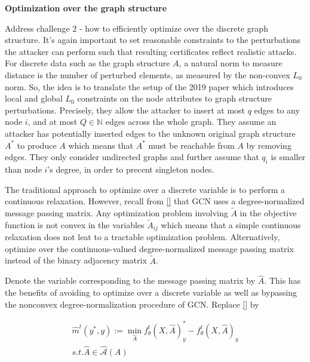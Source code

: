 \documentclass[a4paper,preprint]{sig-alternate}
\begin{document}
\vfill
\pagebreak

\textbf{Optimization over the graph structure}\newline

Address challenge $2$ - how to efficiently optimize over the discrete graph structure.
It's again important to set reasonable constraints to the perturbations the attacker can perform
such that resulting certificates reflect realistic attacks.\newline
For discrete data such as the graph structure $A$, a natural norm to measure distance is the number of perturbed
elements, as measured by the non-convex $L_0$ norm. So, the idea is to translate the setup of the 2019 paper
which introduces local and global $L_0$ constraints on the node attributes to graph structure perturbations.\newline
Precisely, they allow the attacker to insert at most $q$ edges to any node $i$, and at most $Q \in \mathbb{N}$ edges
across the whole graph.\newline
They assume an attacker has potentially inserted edges to the unknown original graph structure $A^{\ast}$ to produce
$A$ which means that $A^{\ast}$ must be reachable from $A$ by removing edges. They only consider undirected graphs
and further assume that $q_i$ is smaller than node $i$'s degree, in order to precent singleton nodes.\newline

The traditional approach to optimize over a discrete variable is to perform a continuous relaxation. However,
recall from \ref{} that GCN uses a degree-normalized message passing matrix. Any optimization problem involving
$\tilde{A}$ in the objective function is not convex in the variables $\tilde{A}_{ij}$ which means that a simple continuous
relaxation does not leat to a tractable optimization problem.\newline
Alternatively, optimize over the continuous-valued degree-normalized message passing matrix instead of the binary
adjacency matrix $\tilde{A}$.\newline

Denote the variable corresponding to the message passing matrix by $\hat{A}$. This has the benefits of avoiding
to optimize over a discrete variable as well as bypassing the nonconvex degree-normalization procedure of GCN.
Replace \ref{} by

\begin{gather}
    \hat{m}^t (y^{\ast}, y) := \min_{\hat{A}} f_{\theta}^t (X, \hat{A})_y^{\ast}
    - f_{\theta}^t (X, \hat{A})_y \\
    s.t. \hat{A} \in \mathcal{\hat{A}}(A)
\end{gather}
\end{document}
